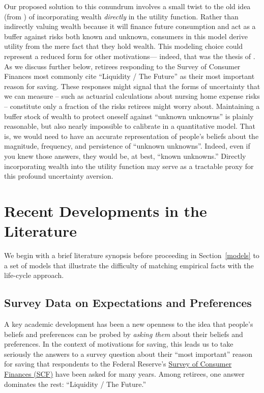\documentclass[12pt,letterpaper, fleqn]{article}
\begin{document}
Our proposed solution to this conundrum involves a small twist to the old idea (from \cite{WhyDoTheRich}) of incorporating wealth \textit{directly} in the utility function.
Rather than indirectly valuing wealth because it will finance future consumption and act as a buffer against risks both known and unknown, consumers in this model derive utility from the mere fact that they hold wealth.
This modeling choice could represent a reduced form for other motivations--- indeed, that was the thesis of \cite{WhyDoTheRich}.
As we discuss further below, retirees responding to the Survey of Consumer Finances most commonly cite ``Liquidity / The Future'' as their most important reason for saving.
These responses might signal that the forms of uncertainty that we can measure -- such as actuarial calculations about nursing home expense risks -- constitute only a fraction of the risks retirees might worry about.
Maintaining a buffer stock of wealth to protect oneself against ``unknown unknowns'' is plainly reasonable, but also nearly impossible to calibrate in a quantitative model.
That is, we would need to have an accurate representation of people's beliefs about the magnitude, frequency, and persistence of ``unknown unknowns''.
Indeed, even if you knew those answers, they would be, at best, ``known unknowns.''
Directly incorporating wealth into the utility function may serve as a tractable proxy for this profound uncertainty aversion.


\section{Recent Developments in the Literature}

We begin with a brief literature synopsis before proceeding in Section~\ref{models} to a set of models that illustrate the difficulty of matching empirical facts with the life-cycle approach.

\subsection{Survey Data on Expectations and Preferences}

A key academic development has been a new openness to the idea that people's beliefs and preferences can be probed by \textit{asking them} about their beliefs and preferences.
In the context of motivations for saving, this leads us to take seriously the answers to a survey question about their ``most important'' reason for saving that respondents to the Federal Reserve's \href{https://www.federalreserve.gov/econres/scfindex.htm}{Survey of Consumer Finances (SCF)} have been asked for many years.
Among retirees, one answer dominates the rest: ``Liquidity / The Future.''
\end{document}
